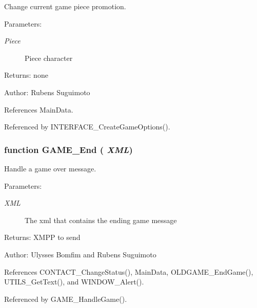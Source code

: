 Change current game piece promotion. 

\begin{Desc}
\item[Parameters:]
\begin{description}
\item[{\em Piece}]Piece character \end{description}
\end{Desc}
\begin{Desc}
\item[Returns:]none \end{Desc}
\begin{Desc}
\item[Author:]Rubens Suguimoto \end{Desc}


References MainData.

Referenced by INTERFACE\_\-CreateGameOptions().
\subsubsection[GAME\_\-End]{\setlength{\rightskip}{0pt plus 5cm}function GAME\_\-End ( {\em XML})}\label{game_2game_8js_b24990adb7161202ebeea265a206ec05}


Handle a game over message. 

\begin{Desc}
\item[Parameters:]
\begin{description}
\item[{\em XML}]The xml that contains the ending game message \end{description}
\end{Desc}
\begin{Desc}
\item[Returns:]XMPP to send \end{Desc}
\begin{Desc}
\item[Author:]Ulysses Bomfim and Rubens Suguimoto \end{Desc}


References CONTACT\_\-ChangeStatus(), MainData, OLDGAME\_\-EndGame(), UTILS\_\-GetText(), and WINDOW\_\-Alert().

Referenced by GAME\_\-HandleGame().
